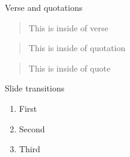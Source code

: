 \begin{frame}{Verse and quotations}
  \begin{verse}
    This is inside of verse
  \end{verse}
  \begin{quotation}
    This is inside of quotation
  \end{quotation}
  \begin{quote}
    This is inside of quote
  \end{quote}
\end{frame}


\begin{frame}{Slide transitions}
  \begin{enumerate}
    \item<1,2> First
    \item<2> Second
    \item<3> Third
  \end{enumerate}
\end{frame}




